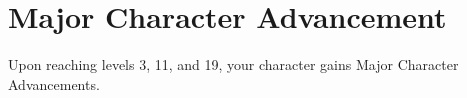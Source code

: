 \section{Major Character Advancement} \label{sec::majorcharacteradvancement}
Upon reaching levels 3, 11, and 19, your character gains Major Character Advancements.

